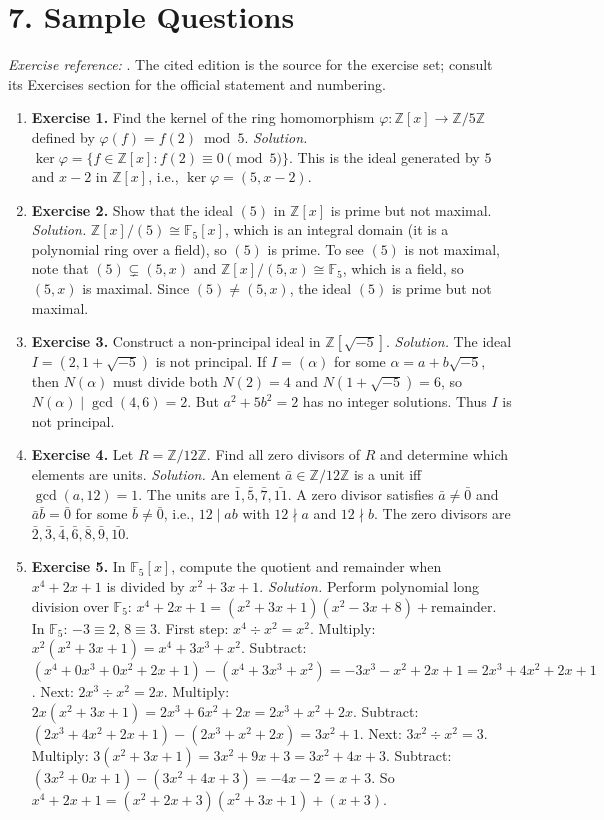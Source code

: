 \section*{7. Sample Questions}
\emph{Exercise reference:} \cite{ring_ref1}. The cited edition is the source for the exercise set; consult its Exercises section for the official statement and numbering.
\begin{enumerate}[leftmargin=*,itemsep=0.9em]
\item \textbf{Exercise 1.} Find the kernel of the ring homomorphism $\varphi\colon\mathbb{Z}[x]\to\mathbb{Z}/5\mathbb{Z}$ defined by $\varphi(f)=f(2)\bmod 5$. \emph{Solution.} $\ker\varphi=\{f\in\mathbb{Z}[x]:f(2)\equiv 0\pmod{5}\}$. This is the ideal generated by $5$ and $x-2$ in $\mathbb{Z}[x]$, i.e., $\ker\varphi=(5,x-2)$.

\item \textbf{Exercise 2.} Show that the ideal $(5)$ in $\mathbb{Z}[x]$ is prime but not maximal. \emph{Solution.} $\mathbb{Z}[x]/(5)\cong\mathbb{F}_5[x]$, which is an integral domain (it is a polynomial ring over a field), so $(5)$ is prime. To see $(5)$ is not maximal, note that $(5)\subsetneq(5,x)$ and $\mathbb{Z}[x]/(5,x)\cong\mathbb{F}_5$, which is a field, so $(5,x)$ is maximal. Since $(5)\ne(5,x)$, the ideal $(5)$ is prime but not maximal.

\item \textbf{Exercise 3.} Construct a non-principal ideal in $\mathbb{Z}[\sqrt{-5}]$. \emph{Solution.} The ideal $I=(2,1+\sqrt{-5})$ is not principal. If $I=(\alpha)$ for some $\alpha=a+b\sqrt{-5}$, then $N(\alpha)$ must divide both $N(2)=4$ and $N(1+\sqrt{-5})=6$, so $N(\alpha)\mid\gcd(4,6)=2$. But $a^2+5b^2=2$ has no integer solutions. Thus $I$ is not principal.

\item \textbf{Exercise 4.} Let $R=\mathbb{Z}/12\mathbb{Z}$. Find all zero divisors of $R$ and determine which elements are units. \emph{Solution.} An element $\bar{a}\in\mathbb{Z}/12\mathbb{Z}$ is a unit iff $\gcd(a,12)=1$. The units are $\bar{1},\bar{5},\bar{7},\bar{11}$. A zero divisor satisfies $\bar{a}\ne\bar{0}$ and $\bar{a}\bar{b}=\bar{0}$ for some $\bar{b}\ne\bar{0}$, i.e., $12\mid ab$ with $12\nmid a$ and $12\nmid b$. The zero divisors are $\bar{2},\bar{3},\bar{4},\bar{6},\bar{8},\bar{9},\bar{10}$.

\item \textbf{Exercise 5.} In $\mathbb{F}_5[x]$, compute the quotient and remainder when $x^4+2x+1$ is divided by $x^2+3x+1$. \emph{Solution.} Perform polynomial long division over $\mathbb{F}_5$: $x^4+2x+1=(x^2+3x+1)(x^2-3x+8)+\text{remainder}$. In $\mathbb{F}_5$: $-3\equiv 2$, $8\equiv 3$. First step: $x^4\div x^2=x^2$. Multiply: $x^2(x^2+3x+1)=x^4+3x^3+x^2$. Subtract: $(x^4+0x^3+0x^2+2x+1)-(x^4+3x^3+x^2)=-3x^3-x^2+2x+1=2x^3+4x^2+2x+1$. Next: $2x^3\div x^2=2x$. Multiply: $2x(x^2+3x+1)=2x^3+6x^2+2x=2x^3+x^2+2x$. Subtract: $(2x^3+4x^2+2x+1)-(2x^3+x^2+2x)=3x^2+1$. Next: $3x^2\div x^2=3$. Multiply: $3(x^2+3x+1)=3x^2+9x+3=3x^2+4x+3$. Subtract: $(3x^2+0x+1)-(3x^2+4x+3)=-4x-2=x+3$. So $x^4+2x+1=(x^2+2x+3)(x^2+3x+1)+(x+3)$.

\end{enumerate}
